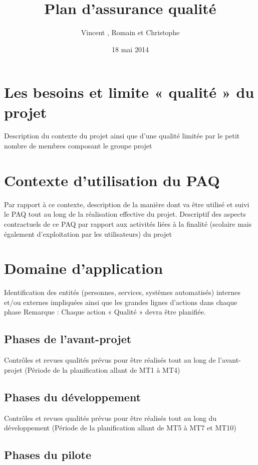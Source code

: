 \documentclass[a4paper, 10pt, oneside]{report}
\title{Plan d'assurance qualité}
\author{Vincent \bsc{Moittie}, Romain \bsc{Notari} et Christophe \bsc{Sin Ronia}}
\date{18 mai 2014}
\begin{document}
\maketitle        %
\tableofcontents  %
\chapter{Les besoins et limite « qualité » du projet}

Description du contexte du projet ainsi que d’une qualité limitée par le petit nombre de membres composant le groupe projet

\chapter{Contexte d’utilisation du PAQ}

Par rapport à ce contexte, description de la manière dont va être utilisé et suivi le PAQ tout au long de la réalisation effective du projet. Descriptif des aspects contractuels de ce PAQ par rapport aux activités liées à la finalité (scolaire mais également d’exploitation par les utilisateurs) du projet

\chapter{Domaine d'application}

Identification des entités (personnes, services, systèmes automatisés) internes et/ou externes impliquées ainsi que les grandes lignes d’actions dans chaque phase Remarque : Chaque action « Qualité » devra être planifiée.

\section{Phases de l’avant-projet}

Contrôles et revues qualités prévus pour être réalisés tout au long de l’avant-projet (Période de la planification allant de MT1 à MT4)

\section{Phases du développement}

Contrôles et revues qualités prévus pour être réalisés tout au long du développement (Période de la planification allant de MT5 à MT7 et MT10)

\section{Phases du pilote}
\end{document}
